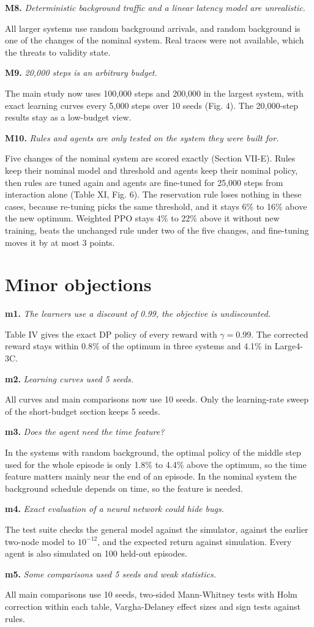 \documentclass[11pt]{article}
\newcommand{\obj}[2]{\par\medskip\textbf{#1.} \emph{#2}\par}
\begin{document}
\obj{M8}{Deterministic background traffic and a linear latency model are unrealistic.}
All larger systems use random background arrivals, and random background is one of the changes of the nominal system. Real traces were not available, which the threats to validity state.

\obj{M9}{20,000 steps is an arbitrary budget.}
The main study now uses 100,000 steps and 200,000 in the largest system, with exact learning curves every 5,000 steps over 10 seeds (Fig. 4). The 20,000-step results stay as a low-budget view.

\obj{M10}{Rules and agents are only tested on the system they were built for.}
Five changes of the nominal system are scored exactly (Section VII-E). Rules keep their nominal model and threshold and agents keep their nominal policy, then rules are tuned again and agents are fine-tuned for 25,000 steps from interaction alone (Table XI, Fig. 6). The reservation rule loses nothing in these cases, because re-tuning picks the same threshold, and it stays 6\% to 16\% above the new optimum. Weighted PPO stays 4\% to 22\% above it without new training, beats the unchanged rule under two of the five changes, and fine-tuning moves it by at most 3 points.

\section*{Minor objections}

\obj{m1}{The learners use a discount of 0.99, the objective is undiscounted.}
Table IV gives the exact DP policy of every reward with $\gamma = 0.99$. The corrected reward stays within 0.8\% of the optimum in three systems and 4.1\% in Large4-3C.

\obj{m2}{Learning curves used 5 seeds.}
All curves and main comparisons now use 10 seeds. Only the learning-rate sweep of the short-budget section keeps 5 seeds.

\obj{m3}{Does the agent need the time feature?}
In the systems with random background, the optimal policy of the middle step used for the whole episode is only 1.8\% to 4.4\% above the optimum, so the time feature matters mainly near the end of an episode. In the nominal system the background schedule depends on time, so the feature is needed.

\obj{m4}{Exact evaluation of a neural network could hide bugs.}
The test suite checks the general model against the simulator, against the earlier two-node model to $10^{-12}$, and the expected return against simulation. Every agent is also simulated on 100 held-out episodes.

\obj{m5}{Some comparisons used 5 seeds and weak statistics.}
All main comparisons use 10 seeds, two-sided Mann-Whitney tests with Holm correction within each table, Vargha-Delaney effect sizes and sign tests against rules.
\end{document}

